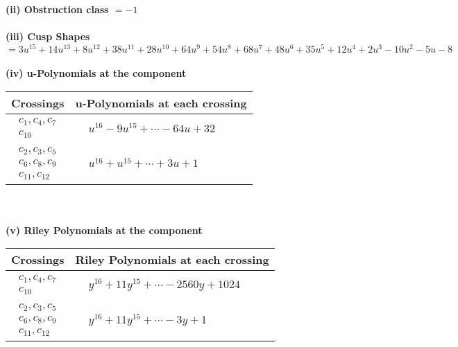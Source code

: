\documentclass[1p]{elsarticle_modified}
\theoremstyle{definition}
\begin{document}
\flushleft \textbf{(ii) Obstruction class $= -1$}\\~\\
\flushleft \textbf{(iii) Cusp Shapes $= 3 u^{15}+14 u^{13}+8 u^{12}+38 u^{11}+28 u^{10}+64 u^9+54 u^8+68 u^7+48 u^6+35 u^5+12 u^4+2 u^3-10 u^2-5 u-8$}\\~\\
\newpage\renewcommand{\arraystretch}{1}
\flushleft \textbf{(iv) u-Polynomials at the component}\newline \\
\begin{tabular}{m{50pt}|m{274pt}}
Crossings & \hspace{64pt}u-Polynomials at each crossing \\
\hline $$\begin{aligned}c_{1},c_{4},c_{7}\\c_{10}\end{aligned}$$&$\begin{aligned}
&u^{16}-9 u^{15}+\cdots-64 u+32
\end{aligned}$\\
\hline $$\begin{aligned}c_{2},c_{3},c_{5}\\c_{6},c_{8},c_{9}\\c_{11},c_{12}\end{aligned}$$&$\begin{aligned}
&u^{16}+u^{15}+\cdots+3 u+1
\end{aligned}$\\
\hline
\end{tabular}\\~\\
\newpage\renewcommand{\arraystretch}{1}
\flushleft \textbf{(v) Riley Polynomials at the component}\newline \\
\begin{tabular}{m{50pt}|m{274pt}}
Crossings & \hspace{64pt}Riley Polynomials at each crossing \\
\hline $$\begin{aligned}c_{1},c_{4},c_{7}\\c_{10}\end{aligned}$$&$\begin{aligned}
&y^{16}+11 y^{15}+\cdots-2560 y+1024
\end{aligned}$\\
\hline $$\begin{aligned}c_{2},c_{3},c_{5}\\c_{6},c_{8},c_{9}\\c_{11},c_{12}\end{aligned}$$&$\begin{aligned}
&y^{16}+11 y^{15}+\cdots-3 y+1
\end{aligned}$\\
\hline
\end{tabular}\\~\\
\end{document}
